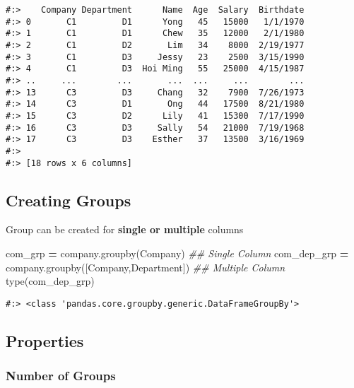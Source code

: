 \documentclass[
]{book}
\newenvironment{Shaded}{\begin{snugshade}}{\end{snugshade}}
\newcommand{\BuiltInTok}[1]{#1}
\newcommand{\CommentTok}[1]{\textcolor[rgb]{0.37,0.37,0.37}{\textit{#1}}}
\newcommand{\NormalTok}[1]{#1}
\newcommand{\OperatorTok}[1]{\textcolor[rgb]{0.43,0.43,0.43}{\textbf{#1}}}
\newcommand{\StringTok}[1]{\textcolor[rgb]{0.5,0.5,0.5}{#1}}
\begin{document}
\begin{verbatim}
#:>    Company Department      Name  Age  Salary  Birthdate
#:> 0       C1         D1      Yong   45   15000   1/1/1970
#:> 1       C1         D1      Chew   35   12000   2/1/1980
#:> 2       C1         D2       Lim   34    8000  2/19/1977
#:> 3       C1         D3     Jessy   23    2500  3/15/1990
#:> 4       C1         D3  Hoi Ming   55   25000  4/15/1987
#:> ..     ...        ...       ...  ...     ...        ...
#:> 13      C3         D3     Chang   32    7900  7/26/1973
#:> 14      C3         D1       Ong   44   17500  8/21/1980
#:> 15      C3         D2      Lily   41   15300  7/17/1990
#:> 16      C3         D3     Sally   54   21000  7/19/1968
#:> 17      C3         D3    Esther   37   13500  3/16/1969
#:> 
#:> [18 rows x 6 columns]
\end{verbatim}

\hypertarget{creating-groups}{%
\subsection{Creating Groups}\label{creating-groups}}

Group can be created for \textbf{single or multiple} columns

\begin{Shaded}
\begin{Highlighting}[]
\NormalTok{com\_grp }\OperatorTok{=}\NormalTok{ company.groupby(}\StringTok{\textquotesingle{}Company\textquotesingle{}}\NormalTok{) }\CommentTok{\#\# Single Column}
\NormalTok{com\_dep\_grp }\OperatorTok{=}\NormalTok{ company.groupby([}\StringTok{\textquotesingle{}Company\textquotesingle{}}\NormalTok{,}\StringTok{\textquotesingle{}Department\textquotesingle{}}\NormalTok{])  }\CommentTok{\#\# Multiple Column}
\BuiltInTok{type}\NormalTok{(com\_dep\_grp)}
\end{Highlighting}
\end{Shaded}

\begin{verbatim}
#:> <class 'pandas.core.groupby.generic.DataFrameGroupBy'>
\end{verbatim}

\hypertarget{properties-1}{%
\subsection{Properties}\label{properties-1}}

\hypertarget{number-of-groups}{%
\subsubsection{Number of Groups}\label{number-of-groups}}
\end{document}
